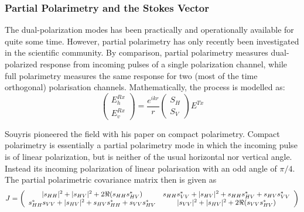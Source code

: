 \subsubsection{ Partial Polarimetry and the Stokes Vector}

The dual-polarization modes has been practically and operationally available for quite some time.
However, partial polarimetry has only recently been investigated in the scientific community. 
By comparison, 
	partial polarimetry measures dual-polarized response from incoming pulses of a single polarization channel,
	while full polarimetry measures the same response for two (most of the time orthogonal) polarisation channels.
Mathematically, the process is modelled as:
\begin{equation}
 \left( 
\begin{array}{c}
 E_h^{Rx} \\
 E_v^{Rx}
\end{array}
 \right) = \frac{e^{ikr}}{r} 
\left( 
\begin{array}{c}
 S_{H} \\
 S_{V}
\end{array}
 \right) E^{Tx}
\end{equation}

Souyris \cite{Souyris_2005_TGRS} pioneered the field with his paper on compact polarimetry.
Compact polarimetry is essentially a partial polarimetry mode in which the incoming pulse is of linear polarization, 
	but is neither of the usual horizontal nor vertical angle.
Instead its incoming polarization of linear polarisation with an odd angle of $\pi/4$.
The partial polarimetric covariance matrix then is given as
\begin{equation}
J = 
\left(	
\begin{array}{c c}
	|s_{HH}|^2 + |s_{HV}|^2 + 2 \Re{(s_{HH}s_{HV}^*)}
& 	s_{HH}s_{VV}^* + |s_{HV}|^2 + s_{HH}s_{HV}^* + s_{HV}s_{VV}^*\\
	s_{HH}^*s_{VV} + |s_{HV}|^2 + s_{HV}s_{HH}^* + s_{VV}s_{HV}^*
& 	|s_{VV}|^2 + |s_{HV}|^2 + 2 \Re{(s_{VV}s_{HV}^*)}
\end{array}
\right)
\end{equation}

